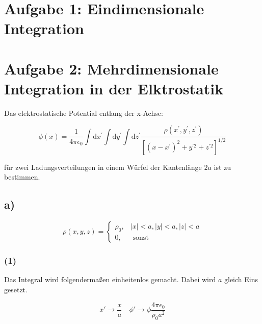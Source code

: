 



\maketitle

\section*{Aufgabe 1: Eindimensionale Integration}

\section*{Aufgabe 2: Mehrdimensionale Integration in der Elktrostatik}

Das elektrostatische Potential entlang der x-Achse:

\begin{equation*}
  \phi(x)=\frac{1}{4 \pi \epsilon_{0}} \int \mathrm{d} x^{\prime} \int \mathrm{d} y^{\prime} \int \mathrm{d} z^{\prime} \frac{\rho\left(x^{\prime}, y^{\prime}, z^{\prime}\right)}{\left[\left(x-x^{\prime}\right)^{2}+y^{\prime 2}+z^{\prime 2}\right]^{1 / 2}}
\end{equation*}

\noindent
für zwei Ladungsverteilungen in einem Würfel der Kantenlänge $2a$ ist zu bestimmen.


\subsection*{a)}

\begin{equation*}
  \rho(x, y, z)=\left\{\begin{array}{ll}\rho_{0}, & |x|<a,|y|<a,|z|<a \\ 0, & \text { sonst }\end{array}\right.
\end{equation*}


\subsubsection*{(1)}

Das Integral wird folgendermaßen einheitenlos gemacht. Dabei wird $a$ gleich Eins
gesetzt.

\begin{equation*}
  x' \rightarrow \frac{x}{a} \quad
  \phi' \rightarrow \phi\frac{4\pi\epsilon_0}{\rho_0 a^2  }
\end{equation*}


